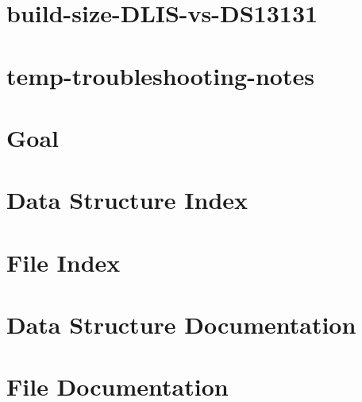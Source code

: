 \let\mypdfximage\pdfximage\def\pdfximage{\immediate\mypdfximage}\documentclass[twoside]{book}
\newcommand{\+}{\discretionary{\mbox{\scriptsize$\hookleftarrow$}}{}{}}
\newcommand{\clearemptydoublepage}{%
  \newpage{\pagestyle{empty}\cleardoublepage}%
}
\begin{document}
\chapter{build-\/size-\/\+DLIS-\/vs-\/\+DS13131}
\label{md_vis_spi_out_build_size_DLIS_vs_DS13131}

\chapter{temp-\/troubleshooting-\/notes}
\label{md_vis_spi_out_temp_troubleshooting_notes}

\chapter{Goal}
\label{md_what_the_python}

\chapter{Data Structure Index}

\chapter{File Index}

\chapter{Data Structure Documentation}






\chapter{File Documentation}






































\backmatter
\newpage
{}
\clearemptydoublepage
{}
\printindex
\end{document}

